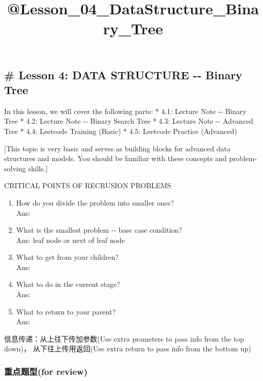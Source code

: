 \documentclass[11pt]{article}
\title{@Lesson\_04\_DataStructure\_Binary\_Tree}
\providecommand{\tightlist}{%
      \setlength{\itemsep}{0pt}\setlength{\parskip}{0pt}}
\begin{document}
    
    
    \maketitle
    
    

    
    \subsection{\# Lesson 4: DATA STRUCTURE -\/- Binary
Tree}\label{lesson-4-data-structure----binary-tree}

In this lesson, we will cover the following parts: * 4.1: Lecture Note
-\/- Binary Tree * 4.2: Lecture Note -\/- Binary Search Tree * 4.3:
Lecture Note -\/- Advanced Tree * 4.4: Leetcode Training (Basic) * 4.5:
Leetcode Practice (Advanced)

{[}This topic is very basic and serves as building blocks for advanced
data structures and models. You should be familiar with these concepts
and problem-solving skills.{]}

     CRITICAL POINTS OF RECRUSION PROBLEMS

\begin{enumerate}
\def\labelenumi{\arabic{enumi}.}
\tightlist
\item
  How do you divide the problem into smaller ones?\\
  Ans:\\
\item
  What is the smallest problem -\/- base case condition?\\
  Ans: leaf node or next of leaf node
\item
  What to get from your children?\\
  Ans:
\item
  What to do in the current stage?\\
  Ans:
\item
  What to return to your parent?\\
  Ans:
\end{enumerate}

 信息传递：从上往下传加参数(Use extra prameters to pass info from the
top down)， 从下往上传用返回(Use extra return to pass info from the
bottom up) 

    \subsubsection{重点题型(for
review)}\label{ux91cdux70b9ux9898ux578bfor-review}
\end{document}
